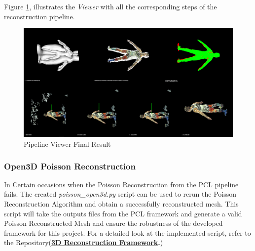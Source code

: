\documentclass[12pt]{report}
\begin{document}
Figure \ref{fig:pipeline_final}, illustrates the \textit{Viewer} with all the corresponding steps of the reconstruction pipeline.

\begin{figure}[H]%
  \centering
 \includegraphics[width=1\textwidth]{pipeline.png}
\caption{Pipeline Viewer Final Result}
\label{fig:pipeline_final} 
\end{figure}

\subsubsection*{Open3D Poisson Reconstruction}
In Certain occasions when the Poisson Reconstruction from the PCL pipeline fails. The created \textit{poisson\_open3d.py} script can be used to rerun the Poisson Reconstruction Algorithm and obtain a successfully reconstructed mesh.
This script will take the outputs files from the PCL framework and generate a valid Poisson Reconstructed Mesh and ensure the robustness of the developed framework for this project.
For a detailed look at the implemented script, refer to the Repository(\textbf{\href{https://github.com/esteban-andrade/3D-Reconstructrion-Scanner} {3D Reconstruction Framework}.})
\end{document}
